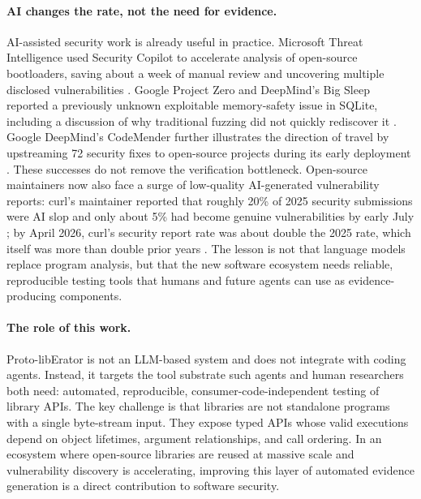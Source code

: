 \documentclass[sigconf,anonymous]{acmart}
\begin{document}
\paragraph{AI changes the rate, not the need for evidence.}
AI-assisted security work is already useful in practice.  Microsoft
Threat Intelligence used Security Copilot to accelerate analysis of
open-source bootloaders, saving about a week of manual review and
uncovering multiple disclosed vulnerabilities \cite{microsoft_bootloaders_ai}.
Google Project Zero and DeepMind's Big Sleep reported a previously
unknown exploitable memory-safety issue in SQLite, including a discussion
of why traditional fuzzing did not quickly rediscover it
\cite{google_big_sleep_sqlite}.  Google DeepMind's CodeMender further
illustrates the direction of travel by upstreaming 72 security fixes to
open-source projects during its early deployment
\cite{google_codemender_2025}.  These successes do not remove the
verification bottleneck.  Open-source maintainers now also face a surge
of low-quality AI-generated vulnerability reports: curl's maintainer
reported that roughly 20\% of 2025 security submissions were AI slop and
only about 5\% had become genuine vulnerabilities by early July
\cite{curl_death_by_slops}; by April 2026, curl's security report rate
was about double the 2025 rate, which itself was more than double prior
years \cite{curl_high_quality_chaos}.  The lesson is not that language
models replace program analysis, but that the new software ecosystem
needs reliable, reproducible testing tools that humans and future agents
can use as evidence-producing components.

\paragraph{The role of this work.}
Proto-libErator is not an LLM-based system and does not integrate with
coding agents.  Instead, it targets the tool substrate such agents and
human researchers both need: automated, reproducible, consumer-code-independent
testing of library APIs.  The key challenge is that libraries are not
standalone programs with a single byte-stream input.  They expose typed
APIs whose valid executions depend on object lifetimes, argument
relationships, and call ordering.  In an ecosystem where open-source
libraries are reused at massive scale and vulnerability discovery is
accelerating, improving this layer of automated evidence generation is a
direct contribution to software security.
\end{document}
